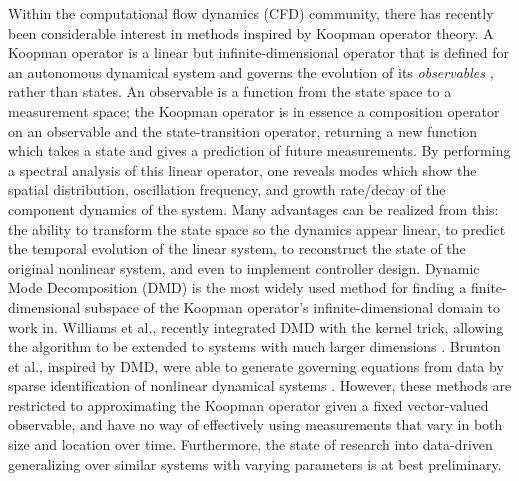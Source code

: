 Within the computational flow dynamics (CFD) community, there has recently been considerable interest in methods inspired by Koopman operator theory. A Koopman operator is a linear but infinite-dimensional operator that is defined for an autonomous dynamical system and governs the evolution of its \emph{observables} \cite{williams2015koopman}, rather than states. An observable is a function from the state space to a measurement space; the Koopman operator is in essence a composition operator on an observable and the state-transition operator, returning a new function which takes a state and gives a prediction of future measurements. By performing a spectral analysis of this linear operator, one reveals modes which show the spatial distribution, oscillation frequency, and growth rate/decay of the component dynamics of the system. Many advantages can be realized from this: the ability to transform the state space so the dynamics appear linear, to predict the temporal evolution of the linear system, to reconstruct the state of the original nonlinear system, and even to implement controller design. Dynamic Mode Decomposition (DMD) is the most widely used method for finding a finite-dimensional subspace of the Koopman operator's infinite-dimensional domain to work in. Williams et al., recently integrated DMD with the kernel trick, allowing the algorithm to be extended to systems with much larger dimensions \cite{williams2015kerneldmd}. Brunton et al., inspired by DMD, were able to generate governing equations from data by sparse
identification of nonlinear dynamical systems \cite{brunton2016discovering}. However, these methods are restricted to approximating the Koopman operator given a fixed vector-valued observable, and have no way of effectively using measurements that vary in both size and location over time. Furthermore, the state of research into data-driven generalizing over similar systems with varying parameters is at best preliminary.






